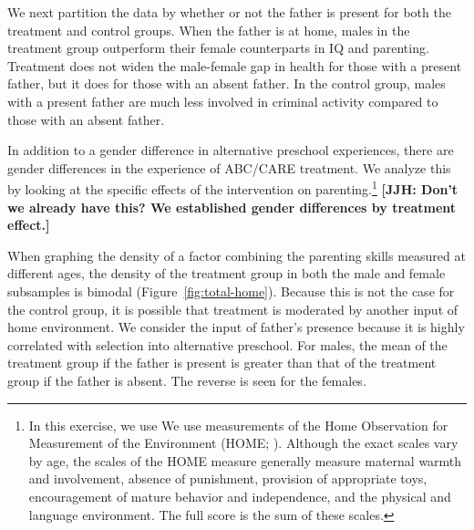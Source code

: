 We next partition the data by whether or not the father is present for both the treatment and control groups. When the father is at home, males in the treatment group outperform their female counterparts in IQ and parenting. Treatment does not widen the male-female gap in health for those with a present father, but it does for those with an absent father. In the control group, males with a present father are much less involved in criminal activity compared to those with an absent father.

In addition to a gender difference in alternative preschool experiences, there are gender differences in the experience of ABC/CARE treatment. We analyze this by looking at the specific effects of the intervention on parenting.\footnote{In this exercise, we use We use measurements of the Home Observation for Measurement of the Environment (HOME; \citet{Bradley-Caldwell_1977_AJMD}). Although the exact scales vary by age, the scales of the HOME measure generally measure maternal warmth and involvement, absence of punishment, provision of appropriate toys, encouragement of mature behavior and independence, and the physical and language environment. The full score is the sum of these scales.} \textbf{[JJH: Don't we already have this? We established gender differences by treatment effect.]}

When graphing the density of a factor combining the parenting skills measured at different ages, the density of the treatment group in both the male and female subsamples is bimodal (Figure~\ref{fig:total-home}). Because this is not the case for the control group, it is possible that treatment is moderated by another input of home environment. We consider the input of father's presence because it is highly correlated with selection into alternative preschool. For males, the mean of the treatment group if the father is present is greater than that of the treatment group if the father is absent. The reverse is seen for the females.

